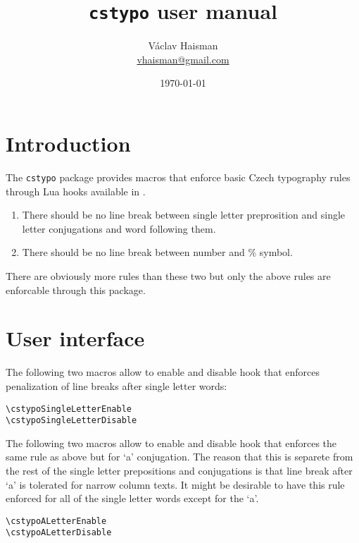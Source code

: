 \documentclass[paper=B5,DIV=calc,parskip=half]{scrartcl}
\author{Václav Haisman\texorpdfstring{%
    \\{\small\href{mailto:vhaisman+cstypo@gmail.com?subject=[cstypo]}{vhaisman@gmail.com}}}{}}
\date{\today}
\title{\texttt{cstypo} user manual}
\begin{document}
\begin{titlepage}
  \maketitle  
\end{titlepage}

\tableofcontents

\section{Introduction}
The \texttt{cstypo} package provides macros that enforce basic Czech
typography rules through Lua hooks available in \LuaTeX{}.

\begin{enumerate}%
\item\label{itm:singleletter} There should be no line break between single
  letter preprosition and single letter conjugations and word following them.
\item\label{itm:percents} There should be no line break between number and \%
  symbol.
\end{enumerate}

There are obviously more rules than these two but only the above rules are
enforcable through this package.

\section{User interface}

The following two macros allow to enable and disable hook that enforces
penalization of line breaks after single letter words:

\begin{lstlisting}[style=myLatexStyle]
\cstypoSingleLetterEnable
\cstypoSingleLetterDisable
\end{lstlisting}

The following two macros allow to enable and disable hook that enforces the
same rule as above but for ‘a’ conjugation. The reason that this is separete
from the rest of the single letter prepositions and conjugations is that line
break after ‘a’ is tolerated for narrow column texts. It might be desirable
to have this rule enforced for all of the single letter words except for the
‘a’.

\begin{lstlisting}[style=myLatexStyle]
\cstypoALetterEnable
\cstypoALetterDisable
\end{lstlisting}
\end{document}
